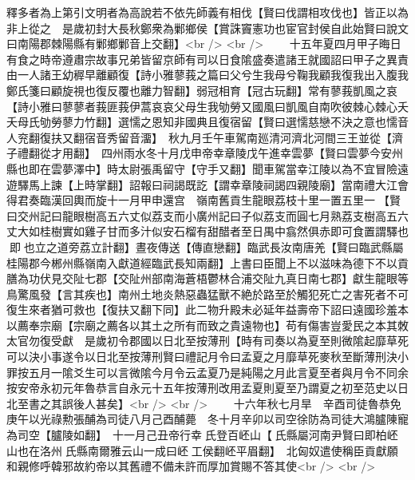 釋多者為上第引文明者為高說若不依先師義有相伐【賢曰伐謂相攻伐也】皆正以為非上從之　是歲初封大長秋鄭衆為鄛鄉侯【賞誅竇憲功也宦官封侯自此始賢曰說文曰南陽郡棘陽縣有鄛鄉鄛音上交翻】<br />
<br />
　　十五年夏四月甲子晦日有食之時帝遵肅宗故事兄弟皆留京師有司以日食隂盛奏遣諸王就國詔曰甲子之異責由一人諸王幼稺早離顧復【詩小雅蓼莪之篇曰父兮生我母兮鞠我顧我復我出入腹我鄭氏箋曰顧旋視也復反覆也離力智翻】弱冠相育【冠古玩翻】常有蓼莪凱風之哀【詩小雅曰蓼蓼者莪匪莪伊蒿哀哀父母生我劬勞又國風曰凱風自南吹彼棘心棘心夭夭母氏劬勞蓼力竹翻】選懦之恩知非國典且復宿留【賢曰選懦慈戀不決之意也懦音人兖翻復扶又翻宿音秀留音澑】　秋九月壬午車駕南廵清河濟北河間三王並從【濟子禮翻從才用翻】　四州雨水冬十月戊申帝幸章陵戊午進幸雲夢【賢曰雲夢今安州縣也即在雲夢澤中】時太尉張禹留守【守手又翻】聞車駕當幸江陵以為不宜冒險遠遊驛馬上諫【上時掌翻】詔報曰祠謁既訖【謂幸章陵祠謁四親陵廟】當南禮大江會得君奏臨漢回輿而旋十一月甲申還宫　嶺南舊貢生龍眼荔枝十里一置五里一【賢曰交州記曰龍眼樹高五六丈似荔支而小廣州記曰子似荔支而圓七月熟荔支樹高五六丈大如桂樹實如雞子甘而多汁似安石榴有甜醋者至日禺中翕然俱赤即可食置謂驛也即也立之道旁荔立計翻】晝夜傳送【傳直戀翻】臨武長汝南唐羌【賢曰臨武縣屬桂陽郡今郴州縣嶺南入獻道經臨武長知兩翻】上書曰臣聞上不以滋味為德下不以貢膳為功伏見交阯七郡【交阯州部南海蒼梧鬱林合浦交阯九真日南七郡】獻生龍眼等鳥驚風發【言其疾也】南州土地炎熱惡蟲猛獸不絶於路至於觸犯死亡之害死者不可復生來者猶可救也【復扶又翻下同】此二物升殿未必延年益壽帝下詔曰遠國珍羞本以薦奉宗廟【宗廟之薦各以其土之所有而致之貴遠物也】苟有傷害豈愛民之本其敇太官勿復受獻　是歲初令郡國以日北至按薄刑【時有司奏以為夏至則微隂起靡草死可以決小事遂令以日北至按薄刑賢曰禮記月令曰孟夏之月靡草死麥秋至斷薄刑決小罪按五月一隂爻生可以言微隂今月令云孟夏乃是純陽之月此言夏至者與月令不同余按安帝永初元年魯恭言自永元十五年按薄刑改用孟夏則夏至乃謂夏之初至范史以日北至書之其誤後人甚矣】<br />
<br />
　　十六年秋七月旱　辛酉司徒魯恭免　庚午以光祿勲張酺為司徒八月己酉酺薨　冬十月辛卯以司空徐防為司徒大鴻臚陳寵為司空【臚陵如翻】　十一月己丑帝行幸氏登百岯山【氏縣屬河南尹賢曰即柏岯山也在洛州氏縣南爾雅云山一成曰岯工侯翻岯平眉翻】　北匈奴遣使稱臣貢獻願和親修呼韓邪故約帝以其舊禮不備未許而厚加賞賜不答其使<br />
<br />
